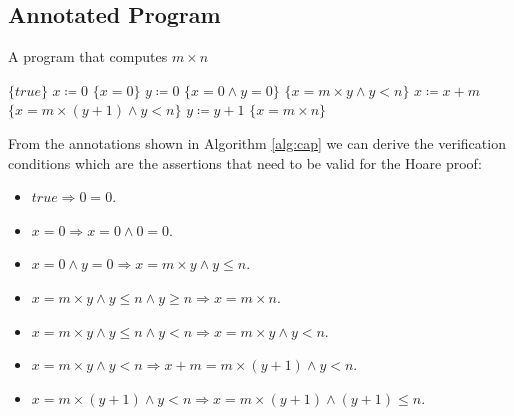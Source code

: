 \subsection{Annotated Program}
\begin{algorithm}[!h]
    \caption{A program that computes $m\times n$}\label{alg:cap}
    \begin{algorithmic}
    \State $\{true\}$
    \State $x \coloneqq 0$
    \State $\{x=0\}$
    \State $y \coloneqq 0$
    \State $\{x=0 \land y=0\}$
     
        \State $\{x = m\times y \land y < n\}$
        \State $x \coloneqq x + m$
        \State $\{x = m\times (y+1) \land y < n\}$
        \State $y \coloneqq y + 1$
    \EndWhile
    \State $\{x = m\times n\}$
    \end{algorithmic}
\end{algorithm}

From the annotations shown in Algorithm \ref{alg:cap} we can derive the verification conditions which are the assertions that need to be valid for the Hoare proof:
\begin{itemize}
    \item $true \Rightarrow 0 = 0$.
    \item $x=0 \Rightarrow x=0 \land 0=0$.
    \item $x=0 \land y=0 \Rightarrow x=m\times y \land y \leq n$.
    \item $x=m\times y \land y \leq n \land y \geq n \Rightarrow x=m\times n$.
    \item $x=m\times y \land y \leq n \land y < n \Rightarrow x=m\times y \land y < n$.
    \item $x=m\times y \land y < n \Rightarrow x + m=m\times (y+1) \land y < n$.
    \item $x= m\times(y+1) \land y < n \Rightarrow x = m\times (y+1) \land (y+1) \leq n$.
\end{itemize}

